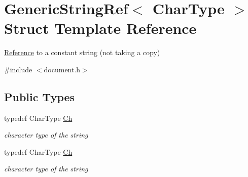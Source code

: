 \hypertarget{structGenericStringRef}{}\section{Generic\+String\+Ref$<$ Char\+Type $>$ Struct Template Reference}
\label{structGenericStringRef}


\hyperlink{structReference}{Reference} to a constant string (not taking a copy)  




{\ttfamily \#include $<$document.\+h$>$}

\subsection*{Public Types}
\begin{DoxyCompactItemize}
\item 
\mbox{\label{structGenericStringRef_a16908c3fce41be380061330c14ba2140}} 
typedef Char\+Type \hyperlink{structGenericStringRef_a16908c3fce41be380061330c14ba2140}{Ch}
\begin{DoxyCompactList}\small\item\em character type of the string \end{DoxyCompactList}\item 
\mbox{\label{structGenericStringRef_a16908c3fce41be380061330c14ba2140}} 
typedef Char\+Type \hyperlink{structGenericStringRef_a16908c3fce41be380061330c14ba2140}{Ch}
\begin{DoxyCompactList}\small\item\em character type of the string \end{DoxyCompactList}\end{DoxyCompactItemize}
